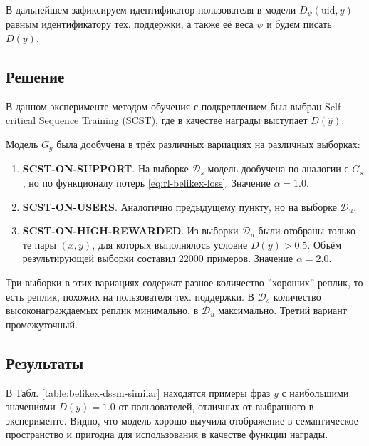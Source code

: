 \documentclass[12pt,a4paper]{amsart}
\begin{document}
В дальнейшем зафиксируем идентификатор пользователя в модели $D_\psi(\text{uid}, y)$ равным идентификатору тех. поддержки, а также её веса $\psi$ и будем писать $D(y)$.


\subsection{Решение}

В данном эксперименте методом обучения с подкреплением был выбран Self-critical Sequence Training (SCST), где в качестве награды выступает $D(\hat{y})$.

Модель $G_g$ была дообучена в трёх различных вариациях на различных выборках:

\begin{enumerate}
	\item \textbf{SCST-ON-SUPPORT}. На выборке $\mathcal{D}_s$ модель дообучена по аналогии с $G_s$, но по функционалу потерь \eqref{eq:rl-belikex-loss}. Значение $\alpha = 1.0$.
	\item \textbf{SCST-ON-USERS}. Аналогично предыдущему пункту, но на выборке $\mathcal{D}_u$.
	\item \textbf{SCST-ON-HIGH-REWARDED}. Из выборки $\mathcal{D}_u$ были отобраны только те пары $(x, y)$, для которых выполнялось условие $D(y) > 0.5$. Объём результирующей выборки составил 22000 примеров. Значение $\alpha = 2.0$.
\end{enumerate}

Три выборки в этих вариациях содержат разное количество ''хороших'' реплик, то есть реплик, похожих на пользователя тех. поддержки. В $\mathcal{D}_s$ количество высоконаграждаемых реплик минимально, в $\mathcal{D}_u$ максимально. Третий вариант промежуточный.

\subsection{Результаты}

В Табл. \ref{table:belikex-dssm-similar} находятся примеры фраз $y$ с наибольшими значениями $D(y) = 1.0$ от пользователей, отличных от выбранного в эксперименте. Видно, что модель хорошо выучила отображение в семантическое пространство и пригодна для использования в качестве функции награды.
\end{document}
